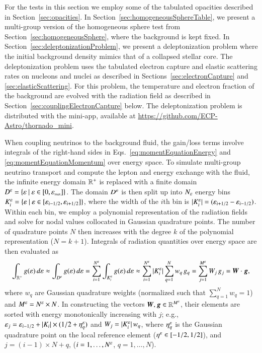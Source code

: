 \documentclass[11pt,letterpaper,twoside,english,final]{article}
\begin{document}
For the tests in this section we employ some of the tabulated opacities described in Section~\ref{sec:opacities}.  
In Section~\ref{sec:homogeneousSphereTable}, we present a multi-group version of the homogeneous sphere test from Section~\ref{sec:homogeneousSphere}, where the background is kept fixed.  
In Section~\ref{sec:deleptonizationProblem}, we present a deleptonization problem where the initial background density mimics that of a collapsed stellar core.  
The deleptonization problem uses the tabulated electron capture and elastic scattering rates on nucleons and nuclei as described in Sections~\ref{sec:electronCapture} and \ref{sec:elasticScattering}.  
For this problem, the temperature and electron fraction of the background are evolved with the radiation field as described in Section~\ref{sec:couplingElectronCapture} below.  
The deleptonization problem is distributed with the mini-app, available at \url{https://github.com/ECP-Astro/thornado_mini}.  

When coupling neutrinos to the background fluid, the gain/loss terms involve integrals of the right-hand sides in Eqs.~\eqref{eq:momentEquationEnergy} and \eqref{eq:momentEquationMomentum} over energy space.  
To simulate multi-group neutrino transport and compute the lepton and energy exchange with the fluid, the infinite energy domain $\mathbb{R}^{+}$ is replaced with a finite domain $D^{\varepsilon}=\{\varepsilon~|~\varepsilon\in[0,\varepsilon_{\mbox{\tiny max}}]\}$.  
The domain $D^{\varepsilon}$ is then split up into $N_{\varepsilon}$ energy bins $K_{i}^{\varepsilon}=\{\varepsilon~|~\varepsilon\in[\varepsilon_{i-1/2},\varepsilon_{i+1/2}]\}$, where the width of the $i$th bin is $|K_{i}^{\varepsilon}|=(\varepsilon_{i+1/2}-\varepsilon_{i-1/2})$.  
Within each bin, we employ a polynomial representation of the radiation fields and solve for nodal values collocated in Gaussian quadrature points.  
The number of quadrature points $N$ then increases with the degree $k$ of the polynomial representation ($N=k+1$).  
Integrals of radiation quantities over energy space are then evaluated as
\begin{equation}
  \int_{\mathbb{R}^{+}}g(\varepsilon)\,d\varepsilon
  \approx\int_{D^{\varepsilon}}g(\varepsilon)\,d\varepsilon
  =\sum_{i=1}^{N^{\varepsilon}}\int_{K_{i}^{\varepsilon}}g(\varepsilon)\,d\varepsilon
  \approx\sum_{i=1}^{N^{\varepsilon}}|K_{i}^{\varepsilon}|\sum_{q=1}^{N}w_{q}\,g_{q}=\sum_{j=1}^{M^{\varepsilon}} W_{j}\,g_{j}=\boldsymbol{W}\cdot\boldsymbol{g},
\end{equation}
where $w_{q}$ are Gaussian quadrature weights (normalized such that $\sum_{q=1}^{N}w_{q}=1$) and $M^{\varepsilon}=N^{\varepsilon}\times N$.  
In constructing the vectors $\boldsymbol{W},\boldsymbol{g}\in\mathbb{R}^{M^{\varepsilon}}$, their elements are sorted with energy monotonically increasing with $j$; e.g., $\varepsilon_{j}=\varepsilon_{i-1/2}+|K_{i}|\times(1/2+\eta_{q}^{\varepsilon})$ and $W_{j}=|K_{i}^{\varepsilon}|\,w_{q}$, where $\eta_{q}^{\varepsilon}$ is the Gaussian quadrature point on the local reference element ($\eta^{\varepsilon}\in[-1/2,1/2]$), and $j=(i-1)\times N+q$, ($i=1,\ldots,N^{\varepsilon}$, $q=1,\ldots,N$).  
\end{document}
